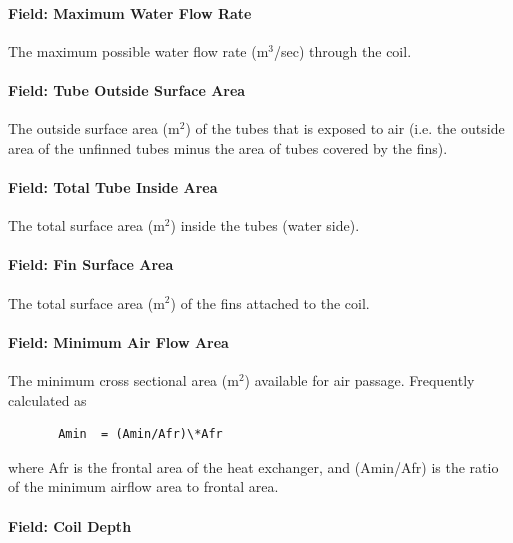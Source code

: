 \paragraph{Field: Maximum Water Flow Rate}\label{field-maximum-water-flow-rate-1}

The maximum possible water flow rate (m\(^{3}\)/sec) through the coil.

\paragraph{Field: Tube Outside Surface Area}\label{field-tube-outside-surface-area}

The outside surface area (m\(^{2}\)) of the tubes that is exposed to air (i.e. the outside area of the unfinned tubes minus the area of tubes covered by the fins).

\paragraph{Field: Total Tube Inside Area}\label{field-total-tube-inside-area}

The total surface area (m\(^{2}\)) inside the tubes (water side).

\paragraph{Field: Fin Surface Area}\label{field-fin-surface-area}

The total surface area (m\(^{2}\)) of the fins attached to the coil.

\paragraph{Field: Minimum Air Flow Area}\label{field-minimum-air-flow-area}

The minimum cross sectional area (m\(^{2}\)) available for air passage. Frequently calculated as

\begin{lstlisting}
       Amin  = (Amin/Afr)\*Afr
\end{lstlisting}

where Afr is the frontal area of the heat exchanger, and (Amin/Afr) is the ratio of the minimum airflow area to frontal area.

\paragraph{Field: Coil Depth}\label{field-coil-depth}

